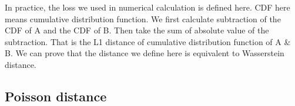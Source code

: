 In practice, the loss we used in numerical calculation is defined here. CDF here means cumulative distribution function.  We first calculate subtraction of the CDF of A and the CDF of B. Then take the sum of absolute value of the subtraction. That is the L1 distance of cumulative distribution function of A \& B. We can prove that the distance we define here is equivalent to Wasserstein distance. 

\subsection{Poisson distance}
